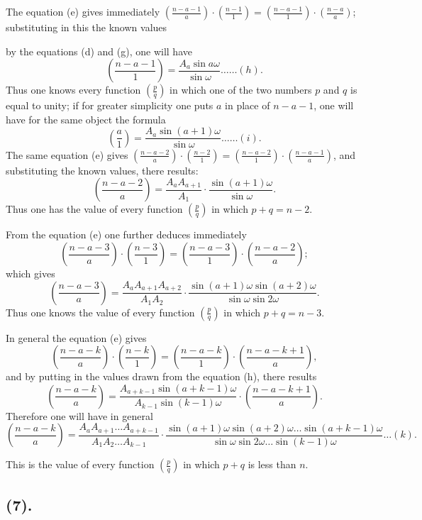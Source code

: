\documentclass{article}
\begin{document}
The equation (e) gives immediately $\left(\frac{n-a-1}{a}\right)\cdot\left(\frac{n-1}{1}\right)=\left(\frac{n-a-1}{1}\right)\cdot\left(\frac{n-a}{a}\right)$; substituting in this the known values

by the equations (d) and (g), one will have
\[ \left(\frac{n-a-1}{1}\right)=\frac{A_{a}\sin a\omega}{\sin\omega}\ldots\ldots(h). \]
Thus one knows every function $\left(\frac{p}{q}\right)$ in which one of the two numbers $p$ and $q$ is equal to unity; if for greater simplicity one puts $a$ in place of $n-a-1$, one will have for the same object the formula
\[ \left(\frac{a}{1}\right)=\frac{A_{a}\sin(a+1)\omega}{\sin\omega}\ldots\ldots(i). \]
The same equation (e) gives $\left(\frac{n-a-2}{a}\right)\cdot\left(\frac{n-2}{1}\right)=\left(\frac{n-a-2}{1}\right)\cdot\left(\frac{n-a-1}{a}\right)$, and substituting the known values, there results:
\[ \left(\frac{n-a-2}{a}\right)=\frac{A_{a}A_{a+1}}{A_{1}}\cdot\frac{\sin(a+1)\omega}{\sin\omega}. \]
Thus one has the value of every function $\left(\frac{p}{q}\right)$ in which $p+q=n-2$.

From the equation (e) one further deduces immediately
\[ \left(\frac{n-a-3}{a}\right)\cdot\left(\frac{n-3}{1}\right)=\left(\frac{n-a-3}{1}\right)\cdot\left(\frac{n-a-2}{a}\right); \]
which gives
\[ \left(\frac{n-a-3}{a}\right)=\frac{A_{a}A_{a+1}A_{a+2}}{A_{1}A_{2}}\cdot\frac{\sin(a+1)\omega\sin(a+2)\omega}{\sin\omega\sin 2\omega}. \]
Thus one knows the value of every function $\left(\frac{p}{q}\right)$ in which $p+q=n-3$.

In general the equation (e) gives
\[ \left(\frac{n-a-k}{a}\right)\cdot\left(\frac{n-k}{1}\right)=\left(\frac{n-a-k}{1}\right)\cdot\left(\frac{n-a-k+1}{a}\right), \]
and by putting in the values drawn from the equation (h), there results
\[ \left(\frac{n-a-k}{a}\right)=\frac{A_{a+k-1}\sin(a+k-1)\omega}{A_{k-1}\sin(k-1)\omega}\cdot\left(\frac{n-a-k+1}{a}\right). \]
Therefore one will have in general
\[ \left(\frac{n-a-k}{a}\right)=\frac{A_{a}A_{a+1}\ldots A_{a+k-1}}{A_{1}A_{2}\ldots A_{k-1}}\cdot\frac{\sin(a+1)\omega\sin(a+2)\omega\ldots\sin(a+k-1)\omega}{\sin\omega\sin 2\omega\ldots\sin(k-1)\omega}\ldots(k). \]

This is the value of every function $\left(\frac{p}{q}\right)$ in which $p+q$ is less than $n$.

\subsection*{(7).}
\end{document}
